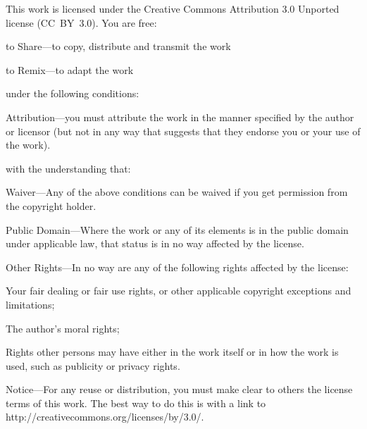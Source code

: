 
\noindent
This work is licensed under the Creative Commons Attribution 3.0
Unported license (CC~BY~3.0).  You are free:

\begin{gitemize}
  \item to Share---to copy, distribute and transmit the work
  \item to Remix---to adapt the work
\end{gitemize}

\noindent
under the following conditions:

\begin{gitemize}
  \item Attribution---you must attribute the work in the manner
    specified by the author or licensor (but not in any way that
    suggests that they endorse you or your use of the work).
\end{gitemize}

\noindent
with the understanding that:

\begin{gitemize}

  \item Waiver---Any of the above conditions can be waived if you get
    permission from the copyright holder.

  \item Public Domain---Where the work or any of its elements is in
    the public domain under applicable law, that status is in no way
    affected by the license.

  \item Other Rights---In no way are any of the following rights
    affected by the license:
    \begin{gitemize}

      \item Your fair dealing or fair use rights, or other applicable
        copyright exceptions and limitations;

      \item The author's moral rights;

      \item Rights other persons may have either in the work itself or
        in how the work is used, such as publicity or privacy rights.

    \end{gitemize}

  \item Notice---For any reuse or distribution, you must make clear to
    others the license terms of this work. The best way to do this is
    with a link to http://creativecommons.org/licenses/by/3.0/.

\end{gitemize}
